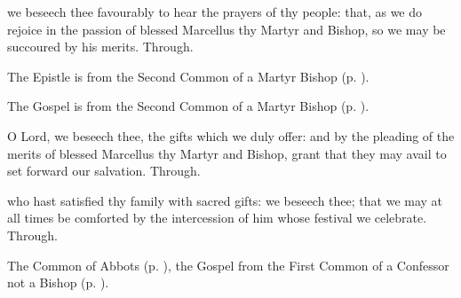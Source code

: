 \collect
{} we beseech thee favourably to hear the prayers of thy people: that, as we do rejoice in the passion of blessed Marcellus thy Martyr and Bishop, so we may be succoured by his merits. Through.

\begin{rubric}
	The Epistle is from the Second Common of a Martyr Bishop (p. \pageref{CommonMartyrBishopIIEpistle}).
\end{rubric}


\begin{rubric}
	The Gospel is from the Second Common of a Martyr Bishop (p. \pageref{CommonMartyrBishopIIGospel}).
\end{rubric}


\secret
{} O Lord, we beseech thee, the gifts which we duly offer: and by the pleading of the merits of blessed Marcellus thy Martyr and Bishop, grant that they may avail to set forward our salvation. Through.


\vspace{-0.4\baselineskip}

\postcommunion

\vspace{-0.25\baselineskip}

 who hast satisfied thy family with sacred gifts: we beseech thee; that we may at all times be comforted by the intercession of him whose festival we celebrate. Through.



\begin{rubric}
	The Common of Abbots (p. \pageref{CommonAbbots}), the Gospel from the First Common of a Confessor not a Bishop (p. \pageref{CommonConfessorNotBishopI}).
\end{rubric}



